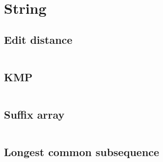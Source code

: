 \section{String}
\subsection{Edit distance}
\inputminted[frame=single,framesep=3pt,tabsize=2,breaklines=true,linenos,label=O($N^2$)]{c++}{string/edit-distance.cpp}

\subsection{KMP}
\inputminted[frame=single,framesep=3pt,tabsize=2,breaklines=true,linenos,label=O(N)]{c++}{string/kmp.cpp}

\subsection{Suffix array}
\inputminted[frame=single,framesep=3pt,tabsize=2,breaklines=true,linenos,label=O(N log(N)$^2$)]{c++}{string/suffix-array.cpp}

\subsection{Longest common subsequence}
\inputminted[frame=single,framesep=3pt,tabsize=2,breaklines=true,linenos,label=O(N)]{c++}{string/lcp.cpp}
